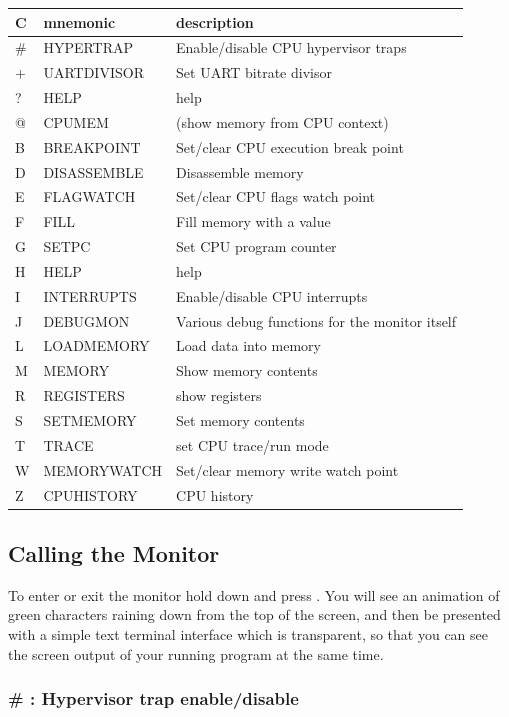{
\ttfamily
\setlength{\tabcolsep}{1mm}
\begin{center}
\begin{tabular}{|l|l|l|}
\hline
C & mnemonic & description \\
\hline
\# & HYPERTRAP & Enable/disable CPU hypervisor traps \\
+ & UARTDIVISOR & Set UART bitrate divisor \\
? & HELP & help \\
@ & CPUMEM & (show memory from CPU context) \\
\hline
B & BREAKPOINT & Set/clear CPU execution break point \\
D & DISASSEMBLE & Disassemble memory \\
E & FLAGWATCH & Set/clear CPU flags watch point \\
F & FILL & Fill memory with a value \\
G & SETPC & Set CPU program counter \\
H & HELP & help \\
I & INTERRUPTS & Enable/disable CPU interrupts \\
J & DEBUGMON & Various debug functions for the monitor itself \\
L & LOADMEMORY & Load data into memory \\
M & MEMORY & Show memory contents \\
R & REGISTERS & show registers \\
S & SETMEMORY & Set memory contents \\
T & TRACE & set CPU trace/run mode \\
W & MEMORYWATCH & Set/clear memory write watch point \\
Z & CPUHISTORY & CPU history \\
\hline
\end{tabular}
\end{center}
}

\subsection {Calling the Monitor}

To enter or exit the monitor hold down \megasymbolkey and press .
You will see an animation of green characters raining down from the top of the screen, and
then be presented with a simple text terminal interface which is transparent, so that you can
see the screen output of your running program at the same time.

\subsubsection{\# : Hypervisor trap enable/disable}

